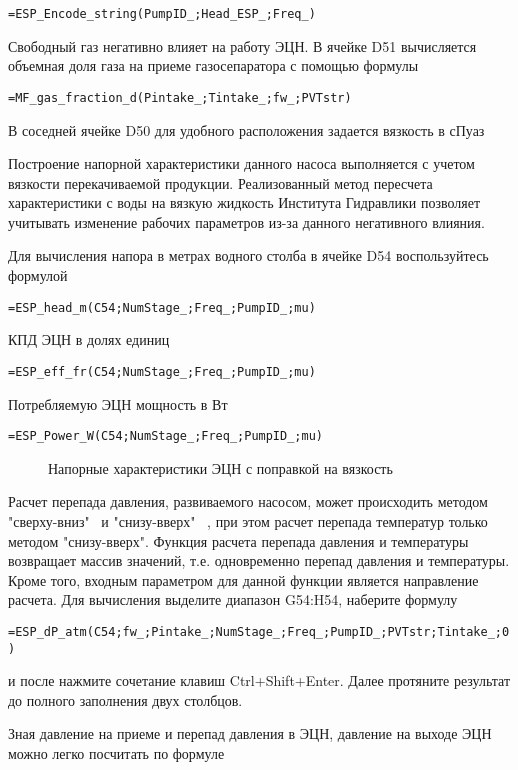 { \small  \texttt{=ESP\_Encode\_string(PumpID\_;Head\_ESP\_;Freq\_)}}

Свободный газ негативно влияет на работу ЭЦН. В ячейке D51 вычисляется объемная доля газа на приеме газосепаратора с помощью формулы

{ \small  \texttt{=MF\_gas\_fraction\_d(Pintake\_;Tintake\_;fw\_;PVTstr)}}
 
В соседней ячейке D50 для удобного расположения задается вязкость в сПуаз

Построение напорной характеристики данного насоса выполняется с учетом вязкости перекачиваемой продукции. Реализованный метод пересчета характеристики с воды на вязкую жидкость Института Гидравлики позволяет учитывать изменение рабочих параметров из-за данного негативного влияния.

Для вычисления напора в метрах водного столба в ячейке D54 воспользуйтесь формулой

{ \small  \texttt{=ESP\_head\_m(C54;NumStage\_;Freq\_;PumpID\_;mu)}}

КПД ЭЦН в долях единиц 

{ \small  \texttt{=ESP\_eff\_fr(C54;NumStage\_;Freq\_;PumpID\_;mu)}}

Потребляемую ЭЦН мощность в Вт

{ \small  \texttt{=ESP\_Power\_W(C54;NumStage\_;Freq\_;PumpID\_;mu)}}

\begin{figure}[h!]
	\center{\texttt{[image: Ex70\_3]}}
	\caption{Напорные характеристики ЭЦН с поправкой на вязкость}
	\label{ris:Ex70_3}
\end{figure}

Расчет перепада давления, развиваемого насосом, может происходить методом "сверху-вниз" \  и "снизу-вверх" \ , при этом расчет перепада температур только методом "снизу-вверх". Функция расчета перепада давления и температуры возвращает массив значений, т.е. одновременно перепад давления и температуры. Кроме того, входным параметром для данной функции является направление расчета. Для вычисления выделите диапазон G54:H54, наберите формулу

{ \small  \texttt{=ESP\_dP\_atm(C54;fw\_;Pintake\_;NumStage\_;Freq\_;PumpID\_;PVTstr;Tintake\_;0)}}

и после нажмите сочетание клавиш  Ctrl+Shift+Enter. Далее протяните результат до полного заполнения двух столбцов.

Зная давление на приеме и перепад давления в ЭЦН, давление на выходе ЭЦН можно легко посчитать по формуле


